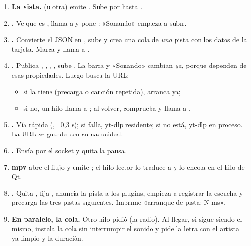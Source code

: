 \begin{enumerate}
  \item \textbf{La vista.}  (u otra) emite . Sube
  por  hasta .
  \item \textbf{.} Ve que  es , llama a
   y pone : «Sonando» empieza a
  subir.
  \item \textbf{.} Convierte el JSON en , sube 
  y crea una cola de \emph{una} pista con los datos de la tarjeta. Marca  y
  llama a .
  \item \textbf{.} Publica , , ,
  , sube . La barra y «Sonando» cambian \emph{ya},
  porque dependen de esas propiedades. Luego busca la URL:
  \begin{itemize}
    \item si  la tiene (precarga o canción repetida), arranca ya;
    \item si no, un hilo llama a ; al volver, comprueba
     y llama a .
  \end{itemize}
  \item \textbf{.} Vía rápida (, ~0,3 s); si falla, yt-dlp
  residente; si no está, yt-dlp en proceso. La URL se guarda con su caducidad.
  \item \textbf{.} Envía  por el socket y
  quita la pausa.
  \item \textbf{mpv} abre el flujo y emite ; el hilo lector lo traduce
  a  y lo encola en el hilo de Qt.
  \item \textbf{.} Quita , fija ,
  anuncia la pista a los plugins, empieza a registrar la escucha y precarga las tres pistas
  siguientes. Imprime «arranque de pista: N ms».
  \item \textbf{En paralelo, la cola.} Otro hilo pidió  (la radio). Al llegar,
  si  sigue siendo el mismo,  instala la cola sin interrumpir
  el sonido y pide la letra con el artista ya limpio y la duración.
\end{enumerate}

